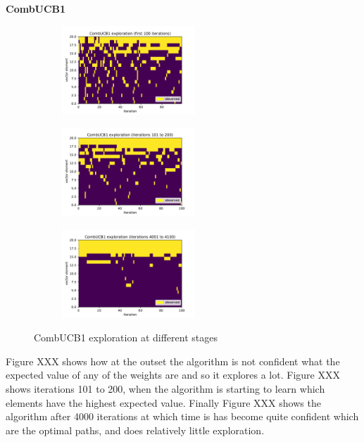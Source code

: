 \noindent \textbf{CombUCB1}\\



\begin{figure}[h!]
\centering
\begin{subfigure}{.33\textwidth}
  \centering
  \includegraphics[width=50mm]{../plots/basicCombUCB1_100iters.pdf}
\end{subfigure}%
\begin{subfigure}{.33\textwidth}
  \centering
  \includegraphics[width=50mm]{../plots/basicCombUCB1_100_200iters.pdf}
\end{subfigure}
\begin{subfigure}{.33\textwidth}
  \centering
  \includegraphics[width=50mm]{../plots/basicCombUCB1_4000_4100iters.pdf}
\end{subfigure}
\caption{CombUCB1 exploration at different stages}
\label{fig:ullm-particle}
\end{figure}

Figure XXX shows how at the outset the algorithm is not confident what the expected value of any of the weights are and so it explores a lot. Figure XXX shows iterations 101 to 200, when the algorithm is starting to learn which elements have the highest expected value. Finally Figure XXX shows the algorithm after 4000 iterations at which time is has become quite confident which are the optimal paths, and does relatively little exploration.\\

